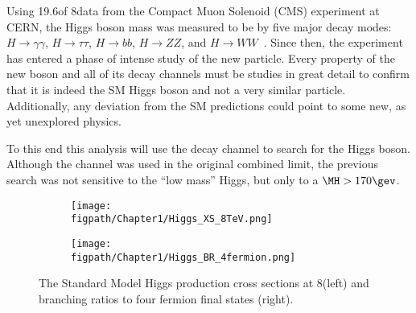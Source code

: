 Using 19.6\fbinv of 8\tev data from the Compact Muon Solenoid (CMS) experiment at CERN, the Higgs boson mass was measured to be  by five major decay modes: $H\rightarrow\gamma\gamma$, $H\rightarrow\tau\tau$, $H\rightarrow{bb}$, $H\rightarrow{ZZ}$, and $H\rightarrow{WW}$~\cite{CMS-PAS-HIG-13-005}.
Since then, the experiment has entered a phase of intense study of the new particle.
Every property of the new boson and all of its decay channels must be studies in great detail to confirm that it is indeed the SM Higgs boson and not a very similar particle.
Additionally, any deviation from the SM predictions could point to some new, as yet unexplored physics.

To this end this analysis will use the \HWWlnujj decay channel to search for the Higgs boson.
Although the \HWWlnujj channel was used in the original combined limit, the previous search was not sensitive to the ``low mass'' Higgs, but only to a $\MH>170\gev$.

\begin{figure}[!hbt]
	\centering
	\begin{subfigure}[t]{0.54\textwidth}
		\texttt{[image: \\figpath/Chapter1/Higgs\_XS\_8TeV.png]}
		\label{fig:CERN_accelerator_complex}
	\end{subfigure}
	\begin{subfigure}[t]{0.41\textwidth}
		\texttt{[image: \\figpath/Chapter1/Higgs\_BR\_4fermion.png]}
		\label{fig:LHC_LEP_injection_complex}
	\end{subfigure}
	\caption{The Standard Model Higgs production cross sections at 8\tev (left) and branching ratios to four fermion final states (right).}
	\label{fig:Higgs_XS_and_BR}
\end{figure}



